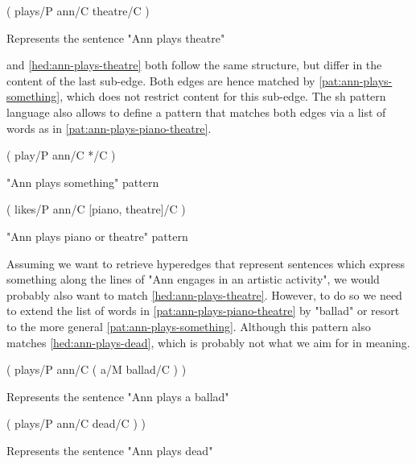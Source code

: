 \documentclass[11pt]{scrreprt}
\begin{document}
\begin{hedge}[h!]
  \normalfont\sffamily
  \centering
  ( plays/P ann/C theatre/C ) 
  \caption{Represents the sentence "Ann plays theatre"}
  \label{hed:ann-plays-theatre}
\end{hedge}
  


 and \cref{hed:ann-plays-theatre} both follow the same structure, but differ in the content of the last sub-edge. Both edges are hence matched by \cref{pat:ann-plays-something}, which does not restrict content for this sub-edge. The \gls{sh} pattern language also allows to define a pattern that matches both edges via a list of words as in \cref{pat:ann-plays-piano-theatre}. 

\begin{pattern}[h!]
  \normalfont\sffamily
  \centering
  ( play/P ann/C */C )
  \caption{"Ann plays something" pattern}
  \label{pat:ann-plays-something}
\end{pattern}

\begin{pattern}[h!]
  \normalfont\sffamily
  \centering
  ( likes/P ann/C [piano, theatre]/C )
  \caption{"Ann plays piano or theatre" pattern}
  \label{pat:ann-plays-piano-theatre}
\end{pattern}

Assuming we want to retrieve hyperedges that represent sentences which express something along the lines of "Ann engages in an artistic activity", we would probably also want to match \cref{hed:ann-plays-theatre}. However, to do so we need to extend the list of words in \cref{pat:ann-plays-piano-theatre} by "ballad" or resort to the more general \cref{pat:ann-plays-something}. Although this pattern also matches \cref{hed:ann-plays-dead}, which is probably not what we aim for in meaning. 

\begin{hedge}[h!]
  \normalfont\sffamily
  \centering
  ( plays/P ann/C ( a/M ballad/C ) ) 
  \caption{Represents the sentence "Ann plays a ballad"}
  \label{hed:ann-plays-ballad}
\end{hedge}

\begin{hedge}[h!]
  \normalfont\sffamily
  \centering
   ( plays/P ann/C dead/C ) )
  \caption{Represents the sentence "Ann plays dead"}
  \label{hed:ann-plays-dead}
\end{hedge}

%
\end{document}
